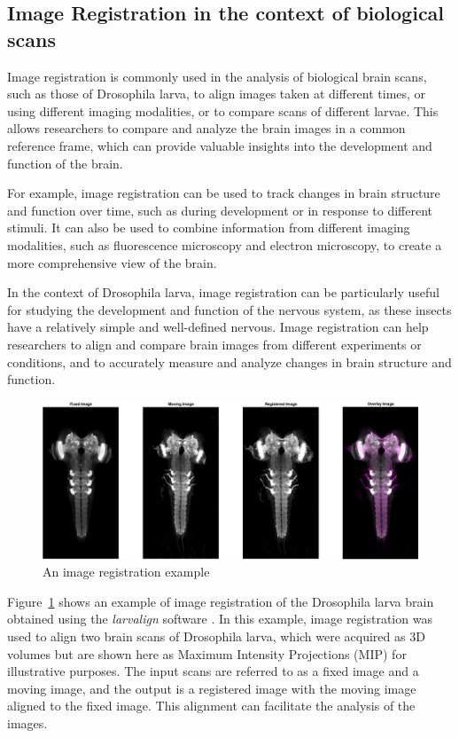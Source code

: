 \documentclass{book}
\begin{document}
	\subsection{Image Registration in the context of biological scans}
	Image registration is commonly used in the analysis of biological brain scans, such as those of Drosophila larva, to align images taken at different times, or using different imaging modalities, or to compare scans of different larvae. This allows researchers to compare and analyze the brain images in a common reference frame, which can provide valuable insights into the development and function of the brain.
	
	For example, image registration can be used to track changes in brain structure and function over time, such as during development or in response to different stimuli. It can also be used to combine information from different imaging modalities, such as fluorescence microscopy and electron microscopy, to create a more comprehensive view of the brain.
	
	In the context of Drosophila larva, image registration can be particularly useful for studying the development and function of the nervous system, as these insects have a relatively simple and well-defined nervous. Image registration can help researchers to align and compare brain images from different experiments or conditions, and to accurately measure and analyze changes in brain structure and function.
	
	\begin{figure}[h!]
		\centering
		\includegraphics[width=\linewidth]{resources/chapter1/figure1.png}
		\caption{An image registration example}
		\label{fig:Registration}
	\end{figure}
	
	Figure~\ref{fig:Registration} shows an example of image registration of the Drosophila larva brain obtained using the \textit{larvalign} software \cite{larvalign}. In this example, image registration was used to align two brain scans of Drosophila larva, which were acquired as 3D volumes but are shown here as Maximum Intensity Projections (MIP) for illustrative purposes. The input scans are referred to as a fixed image and a moving image, and the output is a registered image with the moving image aligned to the fixed image. This alignment can facilitate the analysis of the images.
	
\end{document}

